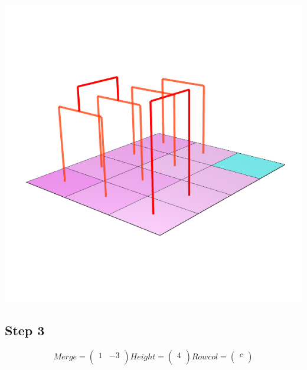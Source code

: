 \documentclass{article}
\begin{document}
\centering \includegraphics[scale=0.3]{Merge2}

\clearpage
\raggedright\subsection{Step 3}
\[
Merge =  \left(\begin{array}{cc}
1 & -3 \\
\end{array} \right)
%
Height = \left( \begin{array}{c}
4 \\
\end{array} \right)
%
Rowcol = \left( \begin{array}{c}
c \\
\end{array} \right)
\]  
\end{document}
